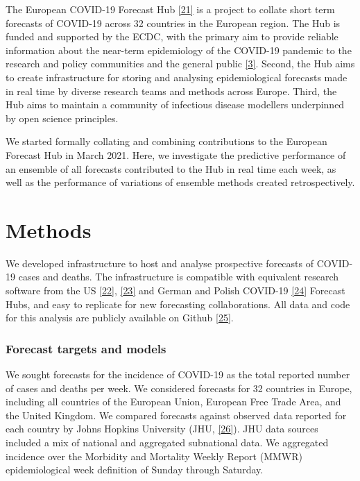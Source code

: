 \documentclass[
]{article}
\begin{document}
The European COVID-19 Forecast Hub \protect\hyperlink{ref-europeancovid-19forecasthubEuropeanCOVID19Forecast2021}{{[}21{]}} is a project to collate short term forecasts of COVID-19 across 32 countries in the European region. The Hub is funded and supported by the ECDC, with the primary aim to provide reliable information about the near-term epidemiology of the COVID-19 pandemic to the research and policy communities and the general public \protect\hyperlink{ref-europeancentrefordiseasepreventionandcontrolForecastingCOVID19Cases2021}{{[}3{]}}. Second, the Hub aims to create infrastructure for storing and analysing epidemiological forecasts made in real time by diverse research teams and methods across Europe. Third, the Hub aims to maintain a community of infectious disease modellers underpinned by open science principles.

We started formally collating and combining contributions to the European Forecast Hub in March 2021. Here, we investigate the predictive performance of an ensemble of all forecasts contributed to the Hub in real time each week, as well as the performance of variations of ensemble methods created retrospectively.

\hypertarget{methods}{%
\section{Methods}\label{methods}}

We developed infrastructure to host and analyse prospective forecasts of COVID-19 cases and deaths. The infrastructure is compatible with equivalent research software from the US \protect\hyperlink{ref-cramerReichlabCovid19forecasthubRelease2021}{{[}22{]}}, \protect\hyperlink{ref-wangReichlabCovidHubUtilsRepository2021}{{[}23{]}} and German and Polish COVID-19 \protect\hyperlink{ref-bracherGermanPolishCOVID192020}{{[}24{]}} Forecast Hubs, and easy to replicate for new forecasting collaborations. All data and code for this analysis are publicly available on Github \protect\hyperlink{ref-PredictivePerformanceMultimodel2022}{{[}25{]}}.

\hypertarget{forecast-targets-and-models}{%
\subsubsection{Forecast targets and models}\label{forecast-targets-and-models}}

We sought forecasts for the incidence of COVID-19 as the total reported number of cases and deaths per week. We considered forecasts for 32 countries in Europe, including all countries of the European Union, European Free Trade Area, and the United Kingdom. We compared forecasts against observed data reported for each country by Johns Hopkins University (JHU, \protect\hyperlink{ref-dongInteractiveWebbasedDashboard2020}{{[}26{]}}). JHU data sources included a mix of national and aggregated subnational data. We aggregated incidence over the Morbidity and Mortality Weekly Report (MMWR) epidemiological week definition of Sunday through Saturday.
\end{document}
